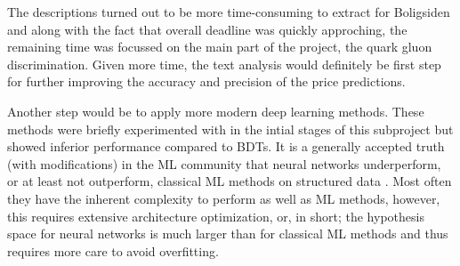 The descriptions turned out to be more time-consuming to extract for Boligsiden and along with the fact that overall deadline was quickly approching, the remaining time was focussed on the main part of the project, the quark gluon discrimination. Given more time, the text analysis would definitely be first step for further improving the accuracy and precision of the price predictions. 

Another step would be to apply more modern deep learning methods. These methods were briefly experimented with in the intial stages of this subproject but showed inferior performance compared to BDTs. It is a generally accepted truth (with modifications) in the ML community that neural networks underperform, or at least not outperform, classical ML methods on structured data \autocite[-]{klambauerSelfNormalizingNeuralNetworks2017}. Most often they have the inherent complexity to perform as well as ML methods, however, this requires extensive architecture optimization, or, in short; the hypothesis space for neural networks is much larger than for classical ML methods and thus requires more care to avoid overfitting.
